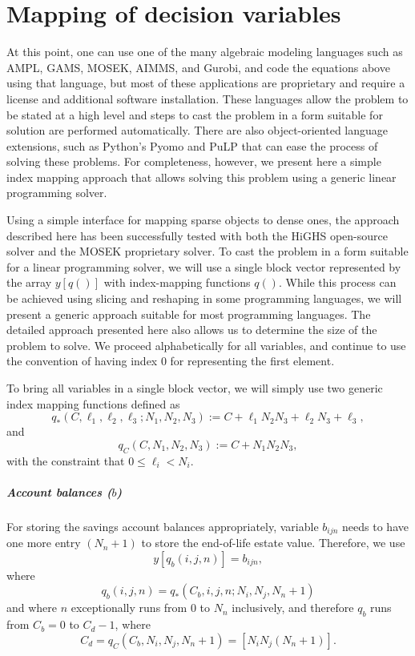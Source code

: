 \documentclass{report}[fleqn,12pt]
\begin{document}
\chapter{Mapping of decision variables}
At this point, one can use one of the many algebraic modeling languages
such as AMPL, GAMS, MOSEK, AIMMS, and Gurobi, and code the equations above
using that language, but most of these applications are
proprietary and require a license and additional software installation.
These languages allow the problem to be stated at a high level and
steps to cast the problem in a form suitable for solution are performed automatically.
There are also object-oriented language extensions, such as Python's Pyomo
and PuLP that can ease the process of solving these problems.
For completeness, however, we present here a simple
index mapping approach that allows solving this problem using a generic
linear programming solver.

Using a simple interface for mapping sparse objects to dense ones, the approach described here
has been successfully tested with both the HiGHS open-source solver
and the MOSEK proprietary solver.
To cast the problem in a form suitable for a linear programming solver, we will use
a single block vector represented by the array $y[q()]$ with index-mapping functions $q()$.
While this process can be achieved using slicing and reshaping in some programming
languages, we will present a generic approach suitable for most programming languages.
The detailed approach presented here also allows us to determine the size of the problem to solve.
We proceed alphabetically for all variables, and continue to use the convention of having
index 0 for representing the first element.

To bring all variables in a single block vector,
we will simply use two generic index mapping functions defined as
\begin{equation}
	q_*(C, \ell_1, \ell_2, \ell_3 ; N_1, N_2, N_3) :=
	C + \ell_1N_2N_3 + \ell_2N_3 + \ell_3 ,
\end{equation}
and
\begin{equation}
	q_C(C, N_1, N_2, N_3) :=
	C + N_1N_2N_3,
\end{equation}
with the constraint that $0 \le \ell_i < N_i$.

\paragraph*{Account balances (\boldmath$b$)}
For storing the savings account balances appropriately, variable $b_{ijn}$ needs to have one
more entry $(N_n + 1)$ to
store the end-of-life estate value. Therefore, we use
\begin{equation}
	y[q_b(i, j, n)] = b_{ijn},
\end{equation}
where
\begin{equation}
	\label{Eq:Extra}
	q_b(i, j, n) = q_*(C_b, i, j, n; N_i, N_j, N_n+1)
\end{equation}
and where $n$ exceptionally runs from 0 to $N_n$ inclusively, and therefore
$q_b$ runs from $C_b = 0$ to $C_{d} - 1$,
where
\[
	C_{d} = q_C(C_b, N_i, N_j, N_n+1) = [N_i N_j (N_n+1)].
\]
\end{document}
